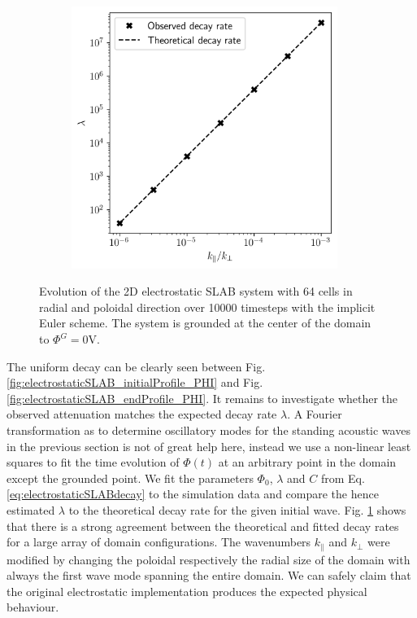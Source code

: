 \begin{figure}[H]
\begin{subfigure}[b]{0.30\textwidth}
		\centering
		\includegraphics[width=0.95\textwidth]{schemes/Electrostatic_analysis_different_k_para_k_perp.png}
		\label{fig:electrostaticSLAB_decayRateFit}
	\end{subfigure}
	\caption{Evolution of the 2D electrostatic SLAB system with 64 cells in radial and poloidal direction over 10000 timesteps with the implicit Euler scheme. The system is grounded at the center of the domain to $\Phi^G = 0$V.}
	\label{fig:electrostaticSLAB}
\end{figure}

The uniform decay can be clearly seen between Fig. \ref{fig:electrostaticSLAB_initialProfile_PHI} and Fig. \ref{fig:electrostaticSLAB_endProfile_PHI}. It remains to investigate whether the observed attenuation matches the expected decay rate $\lambda$. A Fourier transformation as to determine oscillatory modes for the standing acoustic waves in the previous section is not of great help here, instead we use a non-linear least squares to fit the time evolution of $\Phi(t)$ at an arbitrary point in the domain except the grounded point. We fit the parameters $\Phi_0$, $\lambda$ and $C$ from Eq. \ref{eq:electrostaticSLABdecay} to the simulation data and compare the hence estimated $\lambda$ to the theoretical decay rate for the given initial wave. Fig. \ref{fig:electrostaticSLAB_decayRateFit} shows that there is a strong agreement between the theoretical and fitted decay rates for a large array of domain configurations. The wavenumbers $k_\parallel$ and $k_\perp$ were modified by changing the poloidal respectively the radial size of the domain with always the first wave mode spanning the entire domain. We can safely claim that the original electrostatic implementation produces the expected physical behaviour.

